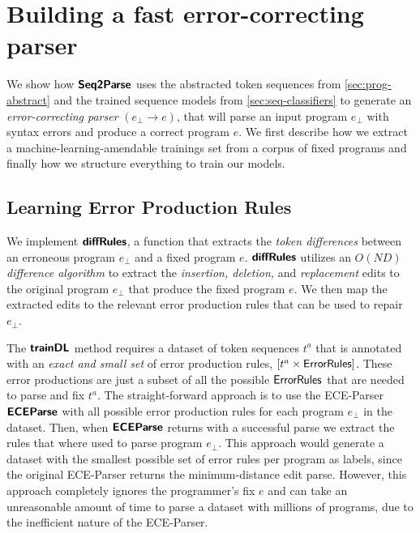 \section{Building a fast error-correcting parser}
\label{sec:whole-system}

We show how $\bm{\mathsf{Seq2Parse}}$ uses the abstracted token sequences from
\autoref{sec:prog-abstract} and the trained sequence models from
\autoref{sec:seq-classifiers} to generate an \emph{error-correcting parser}
$(e_{\bot} \to e)$, that will parse an input program $e_{\bot}$ with syntax
errors and produce a correct program $e$. We first describe how we extract a
machine-learning-amendable trainings set from a corpus of fixed programs and
finally how we structure everything to train our models.


\subsection{Learning Error Production Rules}
\label{sec:whole-system:error-rules}
We implement $\bm{\mathsf{diffRules}}$, a function that extracts the \emph{token differences}
between an erroneous program $e_{\bot}$ and a fixed program $e$. $\bm{\mathsf{diffRules}}$
utilizes an \emph{$O(ND)$ difference algorithm} \citep{Myers_1986} to extract
the \emph{insertion, deletion,} and \emph{replacement} edits to the original
program $e_{\bot}$ that produce the fixed program $e$. We then map the extracted
edits to the relevant error production rules that can be used to repair
$e_{\bot}$.

%
The $\bm{\mathsf{trainDL}}$ method requires a dataset of token sequences $t^a$ that is
annotated with an \emph{exact and small set} of error production rules, \ie
$[t^a \times \mathsf{ErrorRules}]$. These error productions are just a subset of
all the possible $\mathsf{ErrorRules}$ that are needed to parse and fix $t^a$. The
straight-forward approach is to use the ECE-Parser $\bm{\mathsf{ECEParse}}$ with all possible
error production rules for each program $e_{\bot}$ in the dataset. Then, when
$\bm{\mathsf{ECEParse}}$ returns with a successful parse we extract the rules that where used
to parse program $e_{\bot}$. This approach would generate a dataset with the
smallest possible set of error rules per program as labels, since the original
ECE-Parser returns the minimum-distance edit parse. However, this approach
completely ignores the programmer's fix $e$ and can take an unreasonable amount
of time to parse a dataset with millions of programs, due to the inefficient
nature of the ECE-Parser.


